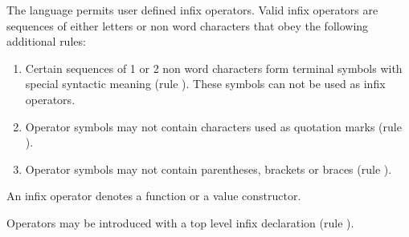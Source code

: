 The \frege{} language permits user defined infix operators.
Valid infix operators are sequences of either letters or non word characters that obey the following additional rules:

\begin{enumerate}

\item Certain sequences of 1 or 2 non word characters form
terminal symbols with special syntactic meaning
(rule ).
These symbols can not be used as infix operators.

\item Operator symbols may not contain characters used as quotation
marks (rule ).

\item Operator symbols may not contain parentheses, brackets or braces (rule ).

\end{enumerate}

An infix operator denotes a function or a
value constructor.

Operators may be introduced with a top level infix declaration (rule ).

\begin{flushleft}
   
\\
  \oder{}  \oder{} \\
 \regex{[123456789]} \oder{} \\

  \\
 \\
  \oder{} \\
   \oder{} \\
 \regex{::} \oder{}
   \regex{->} \oder{}
   \regex{<-} \oder{}
   \regex{$\backslash{}|$} \oder{}
   \regex{=} \oder{} \regex{-} \oder{}
   \regex{!} \oder{}  \oder{}
   \regex{,} \oder{} \regex{;} \oder{}
    \oder{}
   \regex{$\backslash{}\backslash{}$} \oder{}
   \regex{\_}\\

 \regex{$\backslash{}$(} \oder{} \regex{$\backslash{}$)} \oder{} \regex{$\backslash{}$[} \oder{} \regex{$\backslash{}$]} \oder{} \regex{$\backslash{}$\{} \oder{} \regex{$\backslash{}$\}}\\

 \regex{["'\#`]}\\
\end{flushleft}

